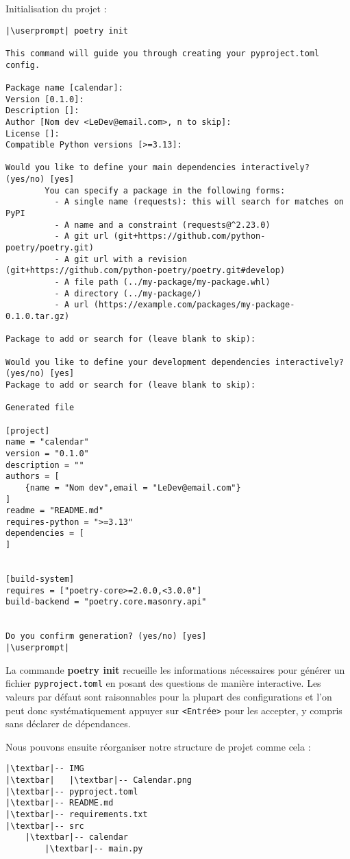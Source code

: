 Initialisation du projet :
\begin{lstlisting}[style=bash]
|\userprompt| poetry init

This command will guide you through creating your pyproject.toml config.

Package name [calendar]:
Version [0.1.0]:
Description []:
Author [Nom dev <LeDev@email.com>, n to skip]:
License []:
Compatible Python versions [>=3.13]:

Would you like to define your main dependencies interactively? (yes/no) [yes]
        You can specify a package in the following forms:
          - A single name (requests): this will search for matches on PyPI
          - A name and a constraint (requests@^2.23.0)
          - A git url (git+https://github.com/python-poetry/poetry.git)
          - A git url with a revision         (git+https://github.com/python-poetry/poetry.git#develop)
          - A file path (../my-package/my-package.whl)
          - A directory (../my-package/)
          - A url (https://example.com/packages/my-package-0.1.0.tar.gz)

Package to add or search for (leave blank to skip):

Would you like to define your development dependencies interactively? (yes/no) [yes]
Package to add or search for (leave blank to skip):

Generated file

[project]
name = "calendar"
version = "0.1.0"
description = ""
authors = [
    {name = "Nom dev",email = "LeDev@email.com"}
]
readme = "README.md"
requires-python = ">=3.13"
dependencies = [
]


[build-system]
requires = ["poetry-core>=2.0.0,<3.0.0"]
build-backend = "poetry.core.masonry.api"


Do you confirm generation? (yes/no) [yes]
|\userprompt| 
\end{lstlisting}

La commande \textbf{poetry init} recueille les informations nécessaires pour générer un fichier \texttt{pyproject.toml} en posant des questions de manière interactive. Les valeurs par défaut sont raisonnables pour la plupart des configurations et l'on peut donc systématiquement appuyer sur \texttt{<Entrée>} pour les accepter, y compris sans déclarer de dépendances.

Nous pouvons ensuite réorganiser notre structure de projet comme cela :
\begin{lstlisting}[style=tree]
|\textbar|-- IMG
|\textbar|   |\textbar|-- Calendar.png
|\textbar|-- pyproject.toml
|\textbar|-- README.md
|\textbar|-- requirements.txt
|\textbar|-- src
    |\textbar|-- calendar
        |\textbar|-- main.py
\end{lstlisting}

